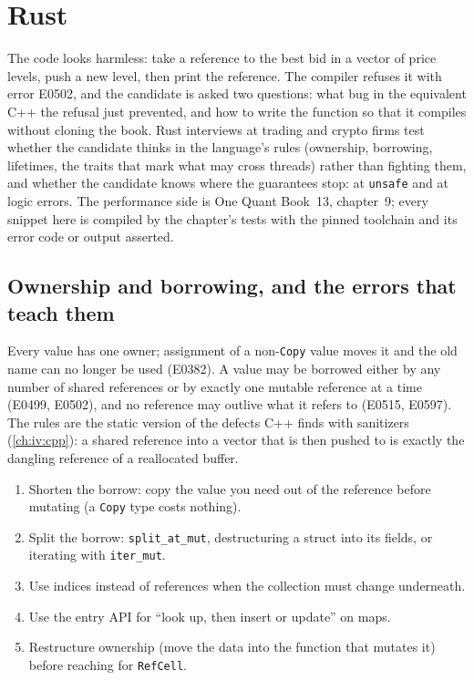\chapter{Rust}\label{ch:iv:rust}

The code looks harmless: take a reference to the best bid in a vector of price levels, push a new level, then print the
reference. The compiler refuses it with error E0502, and the candidate is asked two questions: what bug in the equivalent C++
the refusal just prevented, and how to write the function so that it compiles without cloning the book. Rust interviews at
trading and crypto firms test whether the candidate thinks in the language's rules (ownership, borrowing, lifetimes, the traits
that mark what may cross threads) rather than fighting them, and whether the candidate knows where the guarantees stop: at
\texttt{unsafe} and at logic errors. The performance side is One Quant Book~13, chapter~9; every snippet here is compiled by the
chapter's tests with the pinned toolchain and its error code or output asserted.

\section{Ownership and borrowing, and the errors that teach them}

Every value has one owner; assignment of a non-\texttt{Copy} value moves it and the old name can no longer be used (E0382). A
value may be borrowed either by any number of shared references or by exactly one mutable reference at a time (E0499, E0502),
and no reference may outlive what it refers to (E0515, E0597). The rules are the static version of the defects C++ finds with
sanitizers (\cref{ch:iv:cpp}): a shared reference into a vector that is then pushed to is exactly the dangling reference of a
reallocated buffer.

\label{lst:iv:rust:borrow}

\begin{method}\label{met:iv:rust:borrow}
\begin{enumerate}
\item Shorten the borrow: copy the value you need out of the reference before mutating (a \texttt{Copy} type costs nothing).
\item Split the borrow: \texttt{split\_at\_mut}, destructuring a struct into its fields, or iterating with \texttt{iter\_mut}.
\item Use indices instead of references when the collection must change underneath.
\item Use the entry API for ``look up, then insert or update'' on maps.
\item Restructure ownership (move the data into the function that mutates it) before reaching for \texttt{RefCell}.
\end{enumerate}
\end{method}

